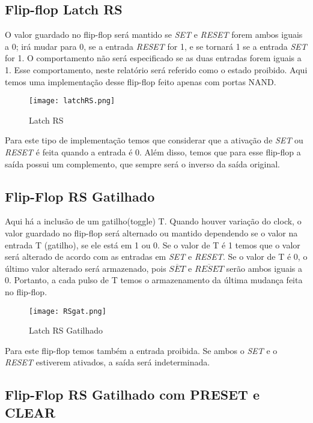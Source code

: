 \documentclass[12pt]{article}
\begin{document}
\subsection{Flip-flop Latch RS}
O valor guardado no flip-flop será mantido se \textit{SET} e \textit{RESET} forem ambos iguais a 0; irá mudar para 0, se a entrada \textit{RESET} for 1, e se tornará 1 se a entrada \textit{SET} for 1. O comportamento não será especificado se as duas entradas forem iguais a 1. Esse comportamento, neste relatório será referido como o estado proibido. Aqui temos uma implementação desse flip-flop feito apenas com portas NAND.

\begin{figure}[H]
	\centering
	\texttt{[image: latchRS.png]}
	\caption{Latch RS}
	\label{fig:latRS}
\end{figure}

Para este tipo de implementação temos que considerar que a ativação de \textit{SET} ou \textit{RESET} é feita quando a entrada é 0. Além disso, temos que para esse flip-flop a saída possui um complemento, que sempre será o inverso da saída original.

\subsection{Flip-Flop RS Gatilhado}

Aqui há a inclusão de um gatilho(toggle) T. Quando houver variação do clock, o valor guardado no flip-flop será alternado ou mantido dependendo se o valor na entrada T (gatilho), se ele está em 1 ou 0. Se o valor de T é 1 temos que o valor será alterado de acordo com as entradas em \textit{SET} e \textit{RESET}. Se o valor de T é 0, o último valor alterado será armazenado, pois \textit{$\overline{SET}$} e \textit{$\overline{RESET}$} serão ambos iguais a 0. Portanto, a cada pulso de T temos o armazenamento da última mudança feita no flip-flop.

\begin{figure}[H]
	\centering
	\texttt{[image: RSgat.png]}
	\caption{Latch RS Gatilhado}
	\label{fig:RSgat}
\end{figure}

Para este flip-flop temos também a entrada proibida. Se ambos o \textit{SET} e o \textit{RESET} estiverem ativados, a saída será indeterminada.


\subsection{Flip-Flop RS Gatilhado com PRESET e CLEAR}
\end{document}

